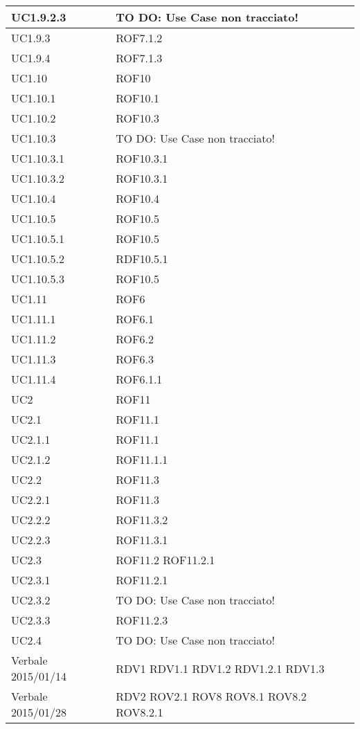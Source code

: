 \begin{center}
\begin{longtable}{| p{4cm} | p{4cm} |}
\hline
UC1.9.2.3 & TO DO: Use Case non tracciato! \\
\hline
UC1.9.3 & ROF7.1.2 \\
\hline
UC1.9.4 & ROF7.1.3 \\
\hline
UC1.10 & ROF10 \\
\hline
UC1.10.1 & ROF10.1 \\
\hline
UC1.10.2 & ROF10.3 \\
\hline
UC1.10.3 & TO DO: Use Case non tracciato! \\
\hline
UC1.10.3.1 & ROF10.3.1 \\
\hline
UC1.10.3.2 & ROF10.3.1 \\
\hline
UC1.10.4 & ROF10.4 \\
\hline
UC1.10.5 & ROF10.5 \\
\hline
UC1.10.5.1 & ROF10.5 \\
\hline
UC1.10.5.2 & RDF10.5.1 \\
\hline
UC1.10.5.3 & ROF10.5 \\
\hline
UC1.11 & ROF6 \\
\hline
UC1.11.1 & ROF6.1 \\
\hline
UC1.11.2 & ROF6.2 \\
\hline
UC1.11.3 & ROF6.3 \\
\hline
UC1.11.4 & ROF6.1.1 \\
\hline
UC2 & ROF11 \\
\hline
UC2.1 & ROF11.1 \\
\hline
UC2.1.1 & ROF11.1 \\
\hline
UC2.1.2 & ROF11.1.1 \\
\hline
UC2.2 & ROF11.3 \\
\hline
UC2.2.1 & ROF11.3 \\
\hline
UC2.2.2 & ROF11.3.2 \\
\hline
UC2.2.3 & ROF11.3.1 \\
\hline
UC2.3 & ROF11.2 \newline ROF11.2.1 \\
\hline
UC2.3.1 & ROF11.2.1 \\
\hline
UC2.3.2 & TO DO: Use Case non tracciato! \\
\hline
UC2.3.3 & ROF11.2.3 \\
\hline
UC2.4 & TO DO: Use Case non tracciato! \\
\hline
Verbale 2015/01/14 & RDV1 \newline RDV1.1 \newline RDV1.2 \newline RDV1.2.1 \newline RDV1.3 \\
\hline
Verbale 2015/01/28 & RDV2 \newline ROV2.1 \newline ROV8 \newline ROV8.1 \newline ROV8.2 \newline ROV8.2.1 \\
\hline
\end{longtable}
\egroup
\end{center}
